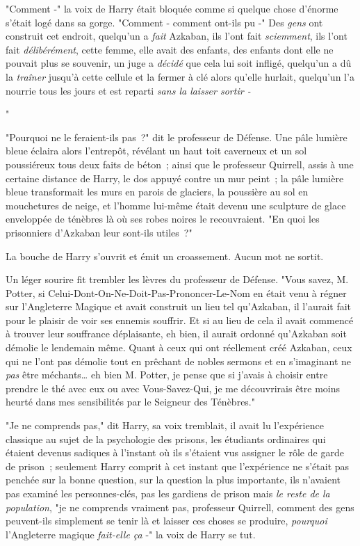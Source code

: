 "Comment -" la voix de Harry était bloquée comme si quelque chose d'énorme s'était logé dans sa gorge. "Comment - comment ont-ils pu -" Des \emph{gens} ont construit cet endroit, quelqu'un a \emph{fait} Azkaban, ils l'ont fait \emph{sciemment}, ils l'ont fait \emph{délibérément}, cette femme, elle avait des enfants, des enfants dont elle ne pouvait plus se souvenir, un juge a \emph{décidé} que cela lui soit infligé, quelqu'un a dû la \emph{traîner} jusqu'à cette cellule et la fermer à clé alors qu'elle hurlait, quelqu'un l'a nourrie tous les jours et est reparti \emph{sans la laisser sortir -}

"

"Pourquoi ne le feraient-ils pas~?" dit le professeur de Défense. Une pâle lumière bleue éclaira alors l'entrepôt, révélant un haut toit caverneux et un sol poussiéreux tous deux faits de béton~; ainsi que le professeur Quirrell, assis à une certaine distance de Harry, le dos appuyé contre un mur peint~; la pâle lumière bleue transformait les murs en parois de glaciers, la poussière au sol en mouchetures de neige, et l'homme lui-même était devenu une sculpture de glace enveloppée de ténèbres là où ses robes noires le recouvraient. "En quoi les prisonniers d'Azkaban leur sont-ils utiles~?"

La bouche de Harry s'ouvrit et émit un croassement. Aucun mot ne sortit.

Un léger sourire fit trembler les lèvres du professeur de Défense. "Vous savez, M. Potter, si Celui-Dont-On-Ne-Doit-Pas-Prononcer-Le-Nom en était venu à régner sur l'Angleterre Magique et avait construit un lieu tel qu'Azkaban, il l'aurait fait pour le plaisir de voir ses ennemis souffrir. Et si au lieu de cela il avait commencé à trouver leur souffrance déplaisante, eh bien, il aurait ordonné qu'Azkaban soit démolie le lendemain même. Quant à ceux qui ont réellement créé Azkaban, ceux qui ne l'ont pas démolie tout en prêchant de nobles sermons et en s'imaginant ne \emph{pas} être méchants… eh bien M. Potter, je pense que si j'avais à choisir entre prendre le thé avec eux ou avec Vous-Savez-Qui, je me découvrirais être moins heurté dans mes sensibilités par le Seigneur des Ténèbres."

"Je ne comprends pas," dit Harry, sa voix tremblait, il avait lu l'expérience classique au sujet de la psychologie des prisons, les étudiants ordinaires qui étaient devenus sadiques à l'instant où ils s'étaient vus assigner le rôle de garde de prison~; seulement Harry comprit à cet instant que l'expérience ne s'était pas penchée sur la bonne question, sur la question la plus importante, ils n'avaient pas examiné les personnes-clés, pas les gardiens de prison mais \emph{le reste de la population}, "je ne comprends vraiment pas, professeur Quirrell, comment des gens peuvent-ils simplement se tenir là et laisser ces choses se produire, \emph{pourquoi} l'Angleterre magique \emph{fait-elle ça} -" la voix de Harry se tut.

